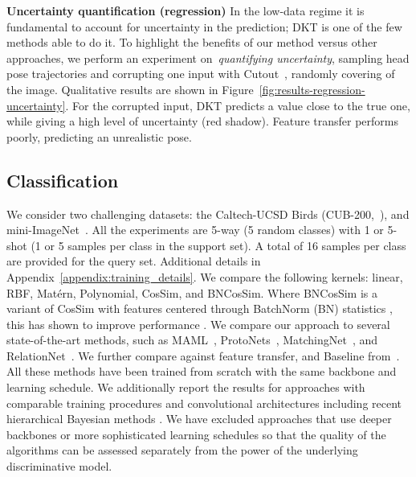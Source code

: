 \documentclass{article}
\begin{document}
\textbf{Uncertainty quantification (regression)} In the low-data regime it is fundamental to account for uncertainty in the prediction; DKT is one of the few methods able to do it. To highlight the benefits of our method versus other approaches, we perform an experiment on~\emph{quantifying uncertainty}, sampling head pose trajectories and corrupting one input with Cutout~\citep{devries2017improved}, randomly covering  of the image. Qualitative results are shown in Figure~\ref{fig:results-regression-uncertainty}. For the corrupted input, DKT predicts a value close to the true one, while giving a high level of uncertainty (red shadow). Feature transfer performs poorly, predicting an unrealistic pose.

\subsection{Classification}
We consider two challenging datasets: the Caltech-UCSD Birds (CUB-200,~\citealp{wah2011caltech}), and mini-ImageNet~\citep{ravi2017optimization}. All the experiments are 5-way (5 random classes) with 1 or 5-shot (1 or 5 samples per class in the support set). A total of 16 samples per class are provided for the query set. Additional details in Appendix~\ref{appendix:training_details}.
We compare the following kernels: linear, RBF, Mat\'ern, Polynomial, CosSim, and BNCosSim. Where BNCosSim is a variant of CosSim with features centered through BatchNorm (BN) statistics \citep{ioffe2015batch}, this has shown to improve performance \citep{wang2019simpleshot}.
We compare our approach to several state-of-the-art methods, such as MAML~\citep{finn2017model}, ProtoNets~\citep{snell2017prototypical}, MatchingNet~\citep{vinyals2016matching}, and RelationNet~\citep{sung2018learning}. We further compare against feature transfer, and Baseline from~\citet{chen2019closerfewshot}. All these methods have been trained from scratch with the same backbone and learning schedule. We additionally report the results for approaches with comparable training procedures and convolutional architectures \citep{mishra2018simple, ravi2017optimization, wang2019simpleshot} including recent hierarchical Bayesian methods \citep{gordon2019meta, grant2018recasting, jerfel2019reconciling}. We have excluded approaches that use deeper backbones or more sophisticated learning schedules \citep{antoniou2019learning, oreshkin2018tadam, qiao2018few, ye2018learning} so that the quality of the algorithms can be assessed separately from the power of the underlying discriminative model.
\end{document}
